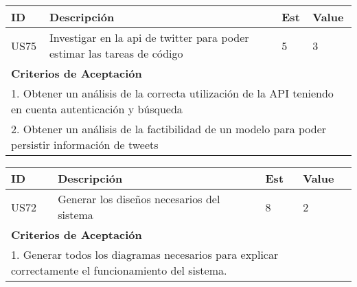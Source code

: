 \bigskip
\begin{tabular}{|p{1cm}|p{10cm}|p{1cm}|p{1cm}|}
\hline
\hline
\textbf{ID}&\textbf{Descripción}&\textbf{Est}&\textbf{Value}\\
\hline
\hline
US75&Investigar en la api de twitter para poder estimar las tareas de código&5&3\\
\hline
\hline
\multicolumn{4}{|p{13cm}|}{ \textbf{Criterios de Aceptación}} \\
\hline
\hline
\multicolumn{4}{|p{13cm}|}{1. Obtener un análisis de la correcta utilización de la API teniendo en cuenta autenticación y búsqueda}\\
\multicolumn{4}{|p{13cm}|}{2. Obtener un análisis de la factibilidad de un modelo para poder persistir información de tweets}\\
\hline
\hline
\end{tabular}

\bigskip
\begin{tabular}{|p{1cm}|p{10cm}|p{1cm}|p{1cm}|}
\hline
\hline
\textbf{ID}&\textbf{Descripción}&\textbf{Est}&\textbf{Value}\\
\hline
\hline
US72&Generar los diseños necesarios del sistema&8&2\\
\hline
\hline
\multicolumn{4}{|p{13cm}|}{ \textbf{Criterios de Aceptación}} \\
\hline
\hline
\multicolumn{4}{|p{13cm}|}{1. Generar todos los diagramas necesarios para explicar correctamente el funcionamiento del sistema.}\\
\hline
\hline
\end{tabular}


